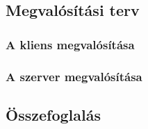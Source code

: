 \subsection{Megvalósítási terv}
\label{sec:megvalositas}

\subsubsection{A kliens megvalósítása}

\subsubsection{A szerver megvalósítása}
\label{sec:szervermegvalositas}


\subsection{Összefoglalás}

